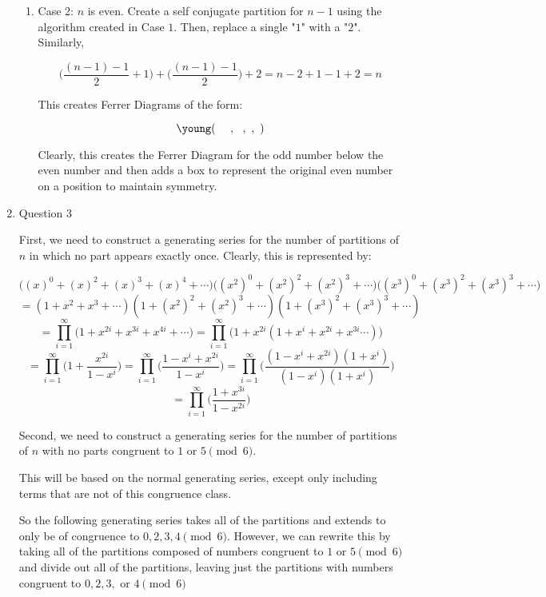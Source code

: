 \documentclass[12pt]{exam}
\begin{document}
\begin{enumerate}
\begin{enumerate}
    \item Case 2: $n$ is even. Create a self conjugate partition for $n - 1$ using the algorithm created in Case $1$. Then, replace a single "$1$" with a "$2$". Similarly, 
    
    $$\Bigg ( \frac{ (n - 1) - 1}{2} + 1\Bigg ) + \Bigg ( \frac{(n - 1) - 1}{2} \Bigg ) + 2 = n - 2 +  1 - 1 + 2 = n $$
    
    This creates Ferrer Diagrams of the form:
    
    \[\young(~~~~,~~,~,~)\]
    
    Clearly, this creates the Ferrer Diagram for the odd number below the even number and then adds a box to represent the original even number on a position to maintain symmetry. 
    
\end{enumerate}

\item Question 3

First, we need to construct a generating series for the number of partitions of $n$ in which no part appears exactly once. Clearly, this is represented by:

$$\Big ( (x)^0 + (x)^2 + (x)^3 + (x)^4 + \cdots \Big ) \Big ( (x^2)^0 + (x^2)^2 + (x^2)^3 + \cdots \Big ) \Big ( (x^3)^0 + (x^3)^2 + (x^3)^3 + \cdots \Big )$$
$$= (1 + x^2 + x^3 + \cdots)(1 + (x^2)^2 + (x^2)^3 + \cdots)(1 + (x^3)^2 + (x^3)^3 + \cdots)$$
$$
= \prod_{i = 1}^{\infty} \Big ( 1 + x^{2i} + x^{3i} + x^{4i} + \cdots \Big ) = \prod_{i = 1}^{\infty} \Big (1 + x^{2i}(1 + x^{i} + x^{2i} + x^{3i} \cdots) \Big )
$$
$$
= \prod_{i = 1}^{\infty} \Big (1 + \frac{x^{2i}}{1 - x^{i}} \Big ) = \prod_{i = 1}^{\infty} \Big (\frac{1 - x^{i} + x^{2i}}{1 - x^{i}} \Big ) = \prod_{i = 1}^{\infty} \Big ( \frac{(1 - x^{i} + x^{2i})(1 + x^{i})}{(1 - x^{i})(1 + x^{i})}  \Big )
$$
$$
= \prod_{i = 1}^{\infty} \Big ( \frac{1 + x^{3i}}{1 - x^{2i}} \Big )
$$

Second, we need to construct a generating series for the number of partitions of $n$ with no parts congruent to $1$ or $5 \pmod{6}$. 

This will be based on the normal generating series, except only including terms that are not of this congruence class. 

So the following generating series takes all of the partitions and extends to only be of congruence to $0, 2, 3, 4 \pmod 6$. However, we can rewrite this by taking all of the partitions composed of numbers congruent to $1$ or $5 \pmod{6}$ and divide out all of the partitions, leaving just the partitions with numbers congruent to $0, 2, 3, $ or $4 \pmod{6}$


\end{enumerate}
\end{document}
